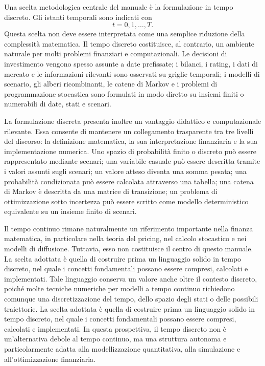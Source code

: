 \documentclass[oneside,openany]{memoir}%
\newcommand{\1}{\mathbf{1}}
\begin{document}
Una scelta metodologica centrale del manuale \`{e} la formulazione in tempo
discreto. Gli istanti temporali sono indicati con
\[
t=0,1,\ldots,T.
\]
Questa scelta non deve essere interpretata come una semplice riduzione della
complessit\`{a} matematica. Il tempo discreto costituisce, al contrario, un
ambiente naturale per molti problemi finanziari e computazionali. Le decisioni
di investimento vengono spesso assunte a date prefissate; i bilanci, i rating,
i dati di mercato e le informazioni rilevanti sono osservati su griglie
temporali; i modelli di scenario, gli alberi ricombinanti, le catene di Markov
e i problemi di programmazione stocastica sono formulati in modo diretto su
insiemi finiti o numerabili di date, stati e scenari.

La formulazione discreta presenta inoltre un vantaggio didattico e
computazionale rilevante. Essa consente di mantenere un collegamento
trasparente tra tre livelli del discorso: la definizione matematica, la sua
interpretazione finanziaria e la sua implementazione numerica. Uno spazio di
probabilit\`{a} finito o discreto pu\`{o} essere rappresentato mediante
scenari; una variabile casuale pu\`{o} essere descritta tramite i valori
assunti sugli scenari; un valore atteso diventa una somma pesata; una
probabilit\`{a} condizionata pu\`{o} essere calcolata attraverso una tabella;
una catena di Markov \`{e} descritta da una matrice di transizione; un
problema di ottimizzazione sotto incertezza pu\`{o} essere scritto come
modello deterministico equivalente su un insieme finito di scenari.

Il tempo continuo rimane naturalmente un riferimento importante nella finanza
matematica, in particolare nella teoria del pricing, nel calcolo stocastico e
nei modelli di diffusione. Tuttavia, esso non costituisce il centro di questo
manuale. La scelta adottata \`{e} quella di costruire prima un linguaggio
solido in tempo discreto, nel quale i concetti fondamentali possano essere
compresi, calcolati e implementati. Tale linguaggio conserva un valore anche
oltre il contesto discreto, poich\'{e} molte tecniche numeriche per modelli a
tempo continuo richiedono comunque una discretizzazione del tempo, dello
spazio degli stati o delle possibili traiettorie. La scelta adottata \`{e}
quella di costruire prima un linguaggio solido in tempo discreto, nel quale i
concetti fondamentali possano essere compresi, calcolati e implementati. In
questa prospettiva, il tempo discreto non \`{e} un'alternativa debole al tempo
continuo, ma una struttura autonoma e particolarmente adatta alla
modellizzazione quantitativa, alla simulazione e all'ottimizzazione finanziaria.
\end{document}
